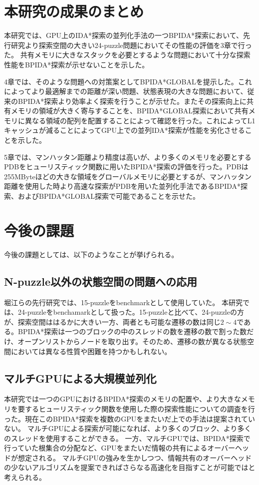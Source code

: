 \documentclass[a4paper,11pt,oneside,openany]{jsbook}
\begin{document}
\section{本研究の成果のまとめ}
本研究では、GPU上のIDA*探索の並列化手法の一つBPIDA*探索において、先行研究\cite{HA17}より探索空間の大きい24-puzzle問題においてその性能の評価を3章で行った。
共有メモリに大きなスタックを必要とするような問題において十分な探索性能をBPIDA*探索が示せないことを示した。

4章では、そのような問題への対策案としてBPIDA*GLOBALを提示した。これによってより最適解までの距離が深い問題、状態表現の大きな問題において、従来のBPIDA*探索より効率よく探索を行うことが示せた。またその探索向上に共有メモリの領域が大きく寄与することを、BPIDA*GLOBAL探索において共有メモリに異なる領域の配列を配置することによって確認を行った。これによってL1キャッシュが減ることによってGPU上での並列IDA*探索が性能を劣化させることを示した。

5章では、マンハッタン距離より精度は高いが、より多くのメモリを必要とするPDBをヒューリスティック関数に用いたBPIDA*探索の評価を行った。PDBは255MByteほどの大きな領域をグローバルメモリに必要とするが、マンハッタン距離を使用した時より高速な探索がPDBを用いた並列化手法であるBPIDA*探索、およびBPIDA*GLOBAL探索で可能であることを示せた。

\section{今後の課題}
今後の課題としては、以下のようなことが挙げられる。

\subsection{N-puzzle以外の状態空間の問題への応用}
堀江らの先行研究\cite{HA17}では、15-puzzleをbenchmarkとして使用していた。
本研究では、24-puzzleをbenchamarkとして扱った。15-puzzleと比べて、24-puzzleの方が、探索空間ははるかに大きい一方、両者とも可能な遷移の数は同じ$2\sim4$である。BPIDA*探索は一つのブロックの中のスレッドの数を遷移の数で割った数だけ、オープンリストからノードを取り出す。そのため、遷移の数が異なる状態空間においては異なる性質や困難を持つかもしれない。


\subsection{マルチGPUによる大規模並列化}
本研究では一つのGPUにおけるBPIDA*探索のメモリの配置や、より大きなメモリを要するヒューリスティック関数を使用した際の探索性能についての調査を行った。現在このBPIDA*探索を複数のGPUをまたいだ上での手法は提案されていない。
マルチGPUによる探索が可能になれば、より多くのブロック、より多くのスレッドを使用することができる。
一方、マルチGPUでは、BPIDA*探索で行っていた根集合の分配など、GPUをまたいだ情報の共有によるオーバーヘッドが想定される。
マルチGPUの強みを生かしつつ、情報共有のオーバーヘッドの少ないアルゴリズムを提案できればさらなる高速化を目指すことが可能ではと考えられる。
\end{document}
